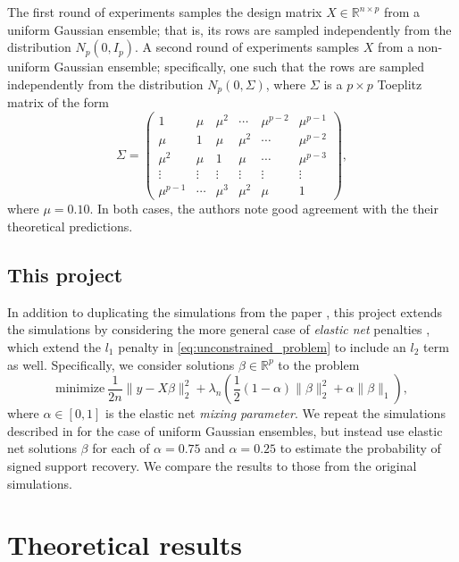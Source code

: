 \documentclass[letterpaper,12pt]{article}
\newcommand{\norm}[1]{\lVert#1\rVert}
\begin{document}
The first round of experiments samples the design matrix
$X \in \mathbb{R}^{n \times p}$ from a uniform Gaussian ensemble; that
is, its rows are sampled independently from the distribution
$N_p(0, I_p)$. A second round of experiments samples $X$ from a
non-uniform Gaussian ensemble; specifically, one such that the rows
are sampled independently from the distribution $N_p(0, \Sigma)$,
where $\Sigma$ is a $p \times p$ Toeplitz matrix of the form
\begin{equation*}
  \Sigma =
  \begin{pmatrix}
    1 & \mu & \mu^2 & \cdots & \mu^{p-2} & \mu^{p-1} \\
    \mu & 1 & \mu & \mu^2 & \cdots & \mu^{p-2} \\
    \mu^2 & \mu & 1 & \mu & \cdots & \mu^{p-3} \\
    \vdots & \vdots & \vdots & \vdots & \vdots & \vdots \\
    \mu^{p-1} & \cdots & \mu^3 & \mu^2 & \mu & 1
  \end{pmatrix},
\end{equation*}
where $\mu = 0.10$. In both cases, the authors note good agreement
with the their theoretical predictions.

\subsection*{This project}

In addition to duplicating the simulations from the paper
\cite{wainwright06}, this project extends the simulations by
considering the more general case of \textit{elastic net} penalties
\cite{zou_hastie05}, which extend the $l_1$ penalty in
\eqref{eq:unconstrained_problem} to include an $l_2$ term as
well. Specifically, we consider solutions $\beta \in \mathbb{R}^p$ to
the problem
\begin{equation*}
  \text{minimize} \
    \frac{1}{2n} \norm{y - X\beta}_2^2
      + \lambda_n \left( \frac{1}{2} (1 - \alpha) \norm{\beta}_2^2
      + \alpha \norm{\beta}_1 \right ),
\end{equation*}
where $\alpha \in [0, 1]$ is the elastic net \textit{mixing
  parameter}. We repeat the simulations described in
\cite{wainwright06} for the case of uniform Gaussian ensembles, but
instead use elastic net solutions $\beta$ for each of $\alpha = 0.75$
and $\alpha = 0.25$ to estimate the probability of signed support
recovery. We compare the results to those from the original
simulations.

\section*{Theoretical results}
\end{document}
